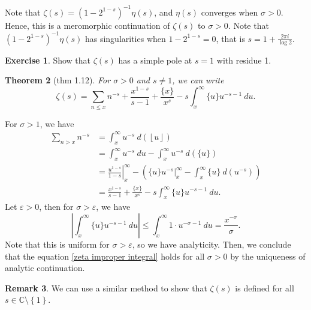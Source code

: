 \documentclass[11pt]{article}
\newtheorem{thm}{Theorem}[subsection]
\theoremstyle{definition}
\newtheorem{exe}[thm]{Exercise}
\newtheorem{remark}[thm]{Remark}
\newcommand{\sm}[0]{\setminus}
\newcommand{\set}[1]{\left\{ #1 \right\}}
\newcommand{\floor}[1]{\left\lfloor #1 \right\rfloor}
\newcommand{\s}[0]{\sigma}
\newcommand{\e}[0]{\varepsilon}
\newcommand{\abs}[1]{\left\lvert#1\right\rvert} %
\newcommand{\CC}{\mathbb{C}}
\begin{document}

Note that $\zeta(s)=(1-2^{1-s})^{-1}\eta(s)$, and $\eta(s)$ converges when $\s>0$. Hence,
this is a meromorphic continuation of $\zeta(s)$ to $\s>0$. Note that
$(1-2^{1-s})^{-1}\eta(s)$ has singularities when $1-2^{1-s}=0$, that is $s=1+\frac{2\pi
i}{\log2}$.

\begin{exe}
Show that $\zeta(s)$ has a simple pole at $s=1$ with residue 1.
\end{exe}

\begin{thm}[thm 1.12]\label{thm:1.12}
For $\s>0$ and $s\neq1$, we can write
\begin{equation}
\zeta(s) = \sum_{n\le x}n^{-s} + \frac{x^{1-s}}{s-1} + \frac{\{x\}}{x^s}
- s \int_x^\infty \{u\}u^{-s-1} ~du .
\label{zeta improper integral}
\end{equation}
\end{thm}
\proof
For $\s>1$, we have
\begin{align*}
\sum_{n>x}n^{-s} &= \int_x^\infty u^{-s}~d\left(\floor{u}\right) \\
&= \int_x^\infty u^{-s}~du - \int_x^\infty u^{-s}~d\left(\{u\}\right) \\
&= \left. \frac{u^{1-s}}{1-s}\right|_x^\infty
- \left(\left.\{u\}u^{-s}\right|_x^\infty - \int_x^\infty\{u\}~d(u^{-s})\right) \\
&= \frac{x^{1-s}}{s-1} + \frac{\{x\}}{x^s} - s \int_x^\infty \{u\} u^{-s-1} ~du .
\end{align*}
Let $\e>0$, then for $\s>\e$, we have
\[
\abs{\int_x^\infty \{u\}u^{-s-1} ~du}
\le \int_x^\infty 1\cdot u^{-\s-1} ~du
= \frac{x^{-\s}}{\s} .
\]
Note that this is uniform for $\s>\e$, so we have analyticity. Then, we conclude that the
equation \ref{zeta improper integral} holds for all $\s>0$ by the uniqueness of analytic
continuation.
\qedhere

\begin{remark}
We can use a similar method to show that $\zeta(s)$ is defined for all $s\in\CC\sm\set{1}$.
\end{remark}
\end{document}
